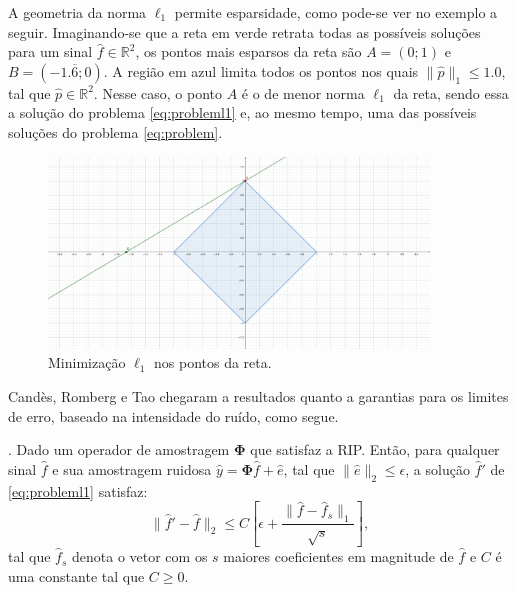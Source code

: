 \documentclass[cic,tc]{iiufrgs}
\begin{document}
A geometria da norma $\ell_1$ permite esparsidade, como pode-se ver no exemplo a seguir. Imaginando-se 
que a reta em verde retrata todas as possíveis soluções para um sinal $\hat{f} \in \mathbb{R}^2$, os pontos
mais esparsos da reta são $A=(0;1)$ e $B=(-1.\overline{6};0)$. A região em azul limita todos os pontos 
nos quais $\lVert\hat{p}\rVert_1 \le 1.0$, tal que $\hat{p} \in \mathbb{R}^2$. Nesse caso, o ponto $A$ é o 
de menor norma $\ell_1$ da reta, sendo essa a solução do problema \eqref{eq:probleml1} e, ao mesmo tempo, 
uma das possíveis soluções do problema \eqref{eq:problem}.
\begin{figure}[h]
    \caption{Minimização $\ell_1$ nos pontos da reta.}
    \begin{center}
        \includegraphics[width=0.9\textwidth]{img//l1ball}
    \end{center}
    \label{fig:l1ball}
\end{figure}

Candès, Romberg e Tao chegaram a resultados quanto a garantias para os limites de erro, baseado na 
intensidade do ruído, como segue.
\begin{teorema}
    \cite{candes2006stable}. Dado um operador de amostragem $\mathbf{\Phi}$ que satisfaz a RIP.
    Então, para qualquer sinal $\hat{f}$ e sua amostragem ruidosa $\hat{y} = \mathbf{\Phi}\hat{f} + \hat{e}$, 
    tal que $\lVert \hat{e} \rVert_2 \le \epsilon$, a solução $\hat{f}'$ de \eqref{eq:probleml1} satisfaz:
    \begin{equation*}
        \lVert \hat{f}' - \hat{f} \rVert_2 \le C \left[ \epsilon + \frac{\lVert \hat{f} - \hat{f}_s \rVert_1}{\sqrt{s}} \right],
    \end{equation*}
    tal que $\hat{f}_s$ denota o vetor com os $s$ maiores coeficientes em magnitude de $\hat{f}$ e $C$ é uma
    constante tal que $C \ge 0$.
\end{teorema}  
\end{document}
